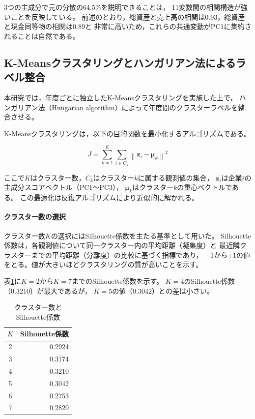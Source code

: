 3つの主成分で元の分散の64.5\%を説明できることは，
11変数間の相関構造が強いことを反映している。
前述のとおり，総資産と売上高の相関は0.93，総資産と現金同等物の相関は0.89と
非常に高いため，これらの共通変動がPC1に集約されることは自然である。

\subsection{K-Meansクラスタリングとハンガリアン法によるラベル整合}
\label{subsec:kmeans-hungarian}

本研究では，年度ごとに独立したK-Meansクラスタリングを実施した上で，
ハンガリアン法（Hungarian algorithm）によって年度間のクラスターラベルを整合させる。

K-Meansクラスタリングは，以下の目的関数を最小化するアルゴリズムである。

\begin{equation}
  J = \sum_{k=1}^{K} \sum_{i \in C_k} \left\| \mathbf{z}_i - \boldsymbol{\mu}_k \right\|^2
  \label{eq:kmeans-objective}
\end{equation}

ここで$K$はクラスター数，$C_k$はクラスター$k$に属する観測値の集合，
$\mathbf{z}_i$は企業$i$の主成分スコアベクトル（PC1〜PC3），
$\boldsymbol{\mu}_k$はクラスター$k$の重心ベクトルである。
この最適化は反復アルゴリズムにより近似的に解かれる。

\paragraph{クラスター数の選択}

クラスター数$K$の選択にはSilhouette係数を主たる基準として用いた。
Silhouette係数は，各観測値について同一クラスター内の平均距離（凝集度）と
最近隣クラスターまでの平均距離（分離度）の比較に基づく指標であり，
$-1$から$+1$の値をとる。値が大きいほどクラスタリングの質が高いことを示す。

表\ref{tab:silhouette}に$K = 2$から$K = 7$までのSilhouette係数を示す。
$K = 4$のSilhouette係数（0.3210）が最大であるが，
$K = 5$の値（0.3042）との差は小さい。

\begin{table}[htbp]
  \centering
  \caption{クラスター数とSilhouette係数}
  \label{tab:silhouette}
  \begin{tabular}{cr}
    \toprule
    $K$ & Silhouette係数 \\
    \midrule
    2 & 0.2924 \\
    3 & 0.3174 \\
    4 & 0.3210 \\
    5 & 0.3042 \\
    6 & 0.2753 \\
    7 & 0.2820 \\
    \bottomrule
  \end{tabular}
\end{table}

